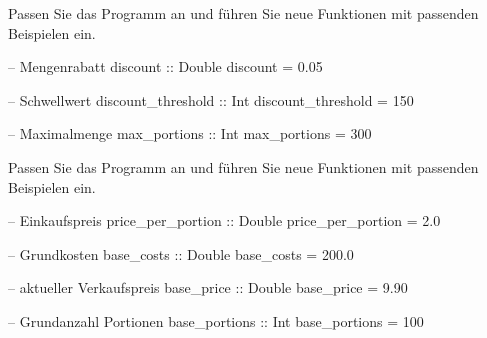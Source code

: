 \begin{frame}[fragile]
    \begin{exercise}[c)]
        Passen Sie das Programm an und führen Sie neue Funktionen mit passenden Beispielen ein.
    \end{exercise}
    \begin{solve}
    \vspace{-\abovedisplayskip}\begin{minipage}[t]{0.5\linewidth}
    \begin{plainhaskell}
-- Mengenrabatt
discount :: Double
discount = 0.05

-- Schwellwert
discount_threshold :: Int
discount_threshold = 150
    \end{plainhaskell}
    \end{minipage}\begin{minipage}[t]{0.5\linewidth}
    \begin{plainhaskell}
-- Maximalmenge
max_portions :: Int
max_portions = 300
    \end{plainhaskell}
    \end{minipage}
    \end{solve}
\end{frame}
\addtocounter{exercise}{-1}\addtocounter{solve}{-1}%
\begin{frame}
    \begin{exercise}[c)]
        Passen Sie das Programm an und führen Sie neue Funktionen mit passenden Beispielen ein.
    \end{exercise}
    \begin{solve}
    \vspace{-\abovedisplayskip}\begin{minipage}[t]{0.5\linewidth}
    \begin{plainhaskell}
-- Einkaufspreis
price_per_portion :: Double
price_per_portion = 2.0

-- Grundkosten
base_costs :: Double
base_costs = 200.0
    \end{plainhaskell}
    \end{minipage}\begin{minipage}[t]{0.5\linewidth}
    \begin{plainhaskell}
-- aktueller Verkaufspreis
base_price :: Double
base_price = 9.90

-- Grundanzahl Portionen
base_portions :: Int
base_portions = 100
    \end{plainhaskell}
    \end{minipage}
    \end{solve}
\end{frame}
